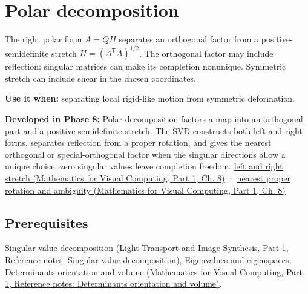\hypertarget{appendix-73f5bcf7a462}{}\label{referencestart:appendix-73f5bcf7a462}
\section{Polar decomposition}\label{appendix-73f5bcf7a462-polar-decomposition}

\hypertarget{appendix-73f5bcf7a462-polar-decomposition}{}

The right polar form \(A=QH\) separates an orthogonal factor from a positive-semidefinite stretch \(H=(A^\mathsf T A)^{1/2}\). The orthogonal factor may include reflection; singular matrices can make its completion nonunique. Symmetric stretch can include shear in the chosen coordinates.

\textbf{Use it when:} separating local rigid-like motion from symmetric deformation.

\textbf{Developed in Phase 8:} Polar decomposition factors a map into an orthogonal part and a positive-semidefinite stretch. The SVD constructs both left and right forms, separates reflection from a proper rotation, and gives the nearest orthogonal or special-orthogonal factor when the singular directions allow a unique choice; zero singular values leave completion freedom. \href{../02-Mathematics-for-Visual-Computing-P01/main.pdf\#nameddest=02-foundations-ii-ch024-polar-decomposition-separates-frame-dependent-stretch-from-orientation}{left and right stretch (Mathematics for Visual Computing, Part 1, Ch. 8)} · \href{../02-Mathematics-for-Visual-Computing-P01/main.pdf\#nameddest=02-foundations-ii-ch024-two-sided-rotations-nearest-proper-rotation-and-nonunique-directions}{nearest proper rotation and ambiguity (Mathematics for Visual Computing, Part 1, Ch. 8)}

\subsection{Prerequisites}\label{appendix-73f5bcf7a462-prerequisites}

\hypertarget{appendix-73f5bcf7a462-prerequisites}{}

\href{../04-Light-Transport-and-Image-Synthesis-P01/main.pdf\#nameddest=appendix-1fad5e7f36fa}{Singular value decomposition (Light Transport and Image Synthesis, Part 1, Reference notes: Singular value decomposition)}, \hyperref[appendix-0b3be18411f9]{Eigenvalues and eigenspaces}, \href{../02-Mathematics-for-Visual-Computing-P01/main.pdf\#nameddest=appendix-da478be01d02}{Determinants orientation and volume (Mathematics for Visual Computing, Part 1, Reference notes: Determinants orientation and volume)}.

